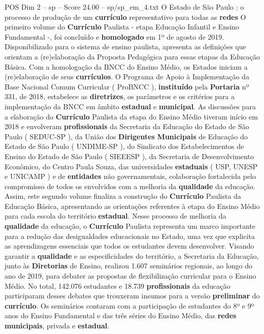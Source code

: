 \begin{textsample}{POS Dim 2 – sp – Score 24.00 – sp/sp\_em\_4.txt}  \label{ex:f2_pos_202}
O Estado de São Paulo : o processo de produção de um \textbf{currículo} representativo para todas as \textbf{redes} O primeiro volume do \textbf{Currículo} Paulista - etapa Educação Infantil e Ensino Fundamental -, foi concluído e \textbf{homologado} em 1º de agosto de 2019.
Disponibilizado para o sistema de ensino paulista, apresenta as definições que orientam a (re)elaboração da Proposta Pedagógica para essas etapas da Educação Básica.
Com a homologação da BNCC do Ensino Médio, os Estados iniciam a (re)elaboração de seus \textbf{currículos}.
O Programa de Apoio à Implementação da Base Nacional Comum Curricular ( ProBNCC ), \textbf{instituído} pela \textbf{Portaria} nº 331, de 2018, estabelece as \textbf{diretrizes}, os parâmetros e os critérios para a implementação da BNCC em âmbito \textbf{estadual} e \textbf{municipal}.
As discussões para a elaboração do \textbf{Currículo} Paulista da etapa do Ensino Médio tiveram início em 2018 e envolveram \textbf{profissionais} da Secretaria da Educação do Estado de São Paulo ( SEDUC-SP ), da União dos \textbf{Dirigentes} \textbf{Municipais} de Educação do Estado de São Paulo ( UNDIME-SP ), do Sindicato dos Estabelecimentos de Ensino do Estado de São Paulo ( SIEEESP ), da Secretaria de Desenvolvimento Econômico, do Centro Paula Souza, das universidades \textbf{estaduais} ( USP, UNESP e UNICAMP ) e de \textbf{entidades} não governamentais, colaboração fortalecida pelo compromisso de todos os envolvidos com a melhoria da \textbf{qualidade} da educação.
Assim, este segundo volume finaliza a construção do \textbf{Currículo} Paulista da Educação Básica, apresentando as orientações referentes à etapa do Ensino Médio para cada escola do território \textbf{estadual}.
Nesse processo de melhoria da \textbf{qualidade} da educação, o \textbf{Currículo} Paulista representa um marco importante para a redução das desigualdades educacionais no Estado, uma vez que explicita as aprendizagens essenciais que todos os estudantes devem desenvolver.
Visando garantir a \textbf{qualidade} e as especificidades do território, a Secretaria da Educação, junto às \textbf{Diretorias} de Ensino, realizou 1.607 seminários regionais, ao longo do ano de 2019, para debater as propostas de flexibilização curricular para o Ensino Médio.
No total, 142.076 estudantes e 18.739 \textbf{profissionais} da educação participaram desses debates que trouxeram insumos para a versão \textbf{preliminar} do \textbf{currículo}.
Os seminários contaram com a participação de estudantes do 8º e 9º anos do Ensino Fundamental e das três séries do Ensino Médio, das \textbf{redes} \textbf{municipais}, privada e \textbf{estadual}.

\end{textsample}
